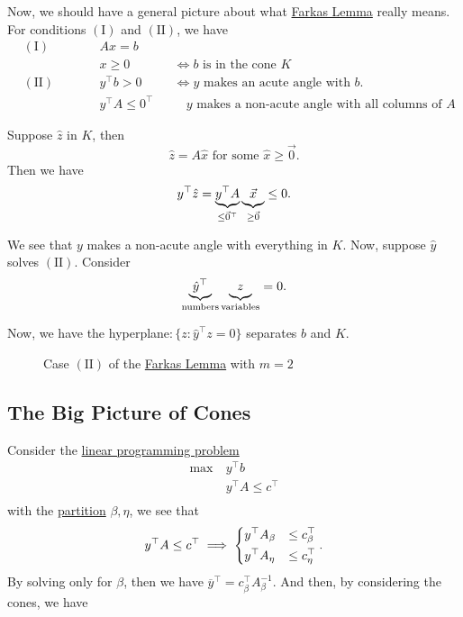 Now, we should have a general picture about what \hyperref[lma:Farkas]{Farkas Lemma} really means. For conditions \((\mathrm{I})\) and \((\mathrm{II})\), we have
\[
	\begin{alignedat}{3}
		& (\mathrm{I}) \qquad&& Ax = b       \\
		&      && x\geq 0    && \iff b \text{ is in the cone }K \\
		& (\mathrm{II}) \qquad&& y^{\top}b> 0 &&\iff y \text{ makes an acute angle with }b.\\
		&      && y^{\top}A\leq 0^{\top}&&\quad y\text{ makes a non-acute angle with all columns of }A
	\end{alignedat}
\]

Suppose \(\hat{z}\) in \(K\), then
\[
	\hat{z} = A \hat{x} \text{ for some }\hat{x} \geq  \vec{0}.
\]
Then we have
\[
	y^{\top} \hat{z} = \underbrace{y^{\top} A}_{\leq\vec{0}^{\top}} \underbrace{\vphantom{y}\vec{x}}_{\geq  \vec{0}}  \leq 0.
\]

We see that \(y\) makes a non-acute angle with everything in \(K\). Now, suppose \(\hat{y}\) solves \((\mathrm{II})\). Consider
\[
	\underbrace{\hat{y}^{\top}}_{\text{numbers}} \underbrace{\vphantom{y}z}_{\text{variables}} = 0.
\]

Now, we have the hyperplane\(\colon\)\(\{z\colon \hat{y} ^{\top} z = 0\}\) separates \(b\) and \(K\).

\begin{figure}[H]
	\centering
	\caption{Case \((\mathrm{II})\) of the \hyperref[lma:Farkas]{Farkas Lemma} with \(m = 2\)}
	\label{fig:Farkas-lemma-extended}
\end{figure}

\subsection{The Big Picture of Cones}
Consider the \hyperref[def:general-linear-programming-problem]{linear programming problem}
\[
	\begin{aligned}
		\max~ & y^{\top} b               \\
		      & y^{\top} A \leq c^{\top} \\
	\end{aligned}
\]
with the \hyperref[def:partition]{partition} \(\beta, \eta\), we see that
\[
	y^{\top} A \leq c^{\top} \implies \begin{dcases}
		y^{\top} A_{\beta} & \leq c^{\top}_{\beta} \\
		y^{\top} A_{\eta}  & \leq c^{\top}_{\eta}
	\end{dcases}.
\]
By solving only for \(\beta\), then we have \(\overline{y}^{\top} = c_{\beta}^{\top} A^{-1}_{\beta}\). And then, by considering the cones, we have

